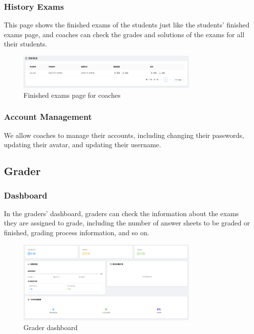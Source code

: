 \documentclass[12pt]{article}
\begin{document}
\subsubsection{History Exams}
This page shows the finished exams of the students just like the students' finished exams page, and coaches can check the grades and solutions of the exams
for all their students.
\begin{figure}[H]
    \centering
    \includegraphics[width=0.8\textwidth]{coach/test-ed.png}
    \caption{Finished exams page for coaches}
    \label{fig:FinishedExamsForCoach page}
\end{figure}
\subsubsection{Account Management}
We allow coaches to manage their accounts, including changing their passwords, updating their avatar, and updating their username.
\subsection{Grader}
\subsubsection{Dashboard}
In the graders' dashboard, graders can check the information about the exams they are assigned to grade, including the number of answer sheets to be graded or finished,
grading process information, and so on.
\begin{figure}[H]
    \centering
    \includegraphics[width=0.8\textwidth]{grader/dashboard.png}
    \caption{Grader dashboard}
    \label{fig:GraderDashboard page}
\end{figure}
\end{document}
